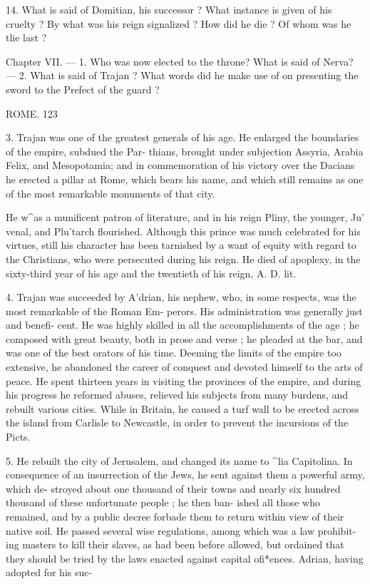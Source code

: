 \documentclass[openany,a4paper]{memoir}
\begin{document}
14. What is said of Domitian, his successor ? What instance is given 
of his cruelty ? By what was his reign signalized ? How did he die ? 
Of whom was he tlie last ? 

Chapter VII. — 1. Who was now elected to the throne? What is 
said of Nerva? — 2. What is said of Trajan ? What words did he make 
use of on presenting the sword to the Prefect of the guard ? 



ROME. 123 

3. Trajan was one of the greatest generals of his age. He 
enlarged the boundaries of the empire, subdued the Par- 
thians, brought under subjection Assyria, Arabia Felix, and 
Mesopotamia; and in commemoration of his victory over 
the Dacians he erected a pillar at Rome, which bears his 
name, and which still remains as one of the most remarkable 
monuments of that city. 

He w^as a munificent patron of literature, and in his 
reign Pliny, the younger, Ju' venal, and Plu'tarch flourished. 
Although this prince was much celebrated for his virtues, 
still his character has been tarnished by a want of equity 
with regard to the Christians, who were persecuted during 
his reign. He died of apoplexy, in the sixty-third year of 
his age and the twentieth of his reign, A. D. lit. 

4. Trajan was succeeded by A'drian, his nephew, who, in 
some respects, was the most remarkable of the Roman Em- 
perors. His administration was generally just and benefi- 
cent. He was highly skilled in all the accomplishments of 
the age ; he composed with great beauty, both in prose and 
verse ; he pleaded at the bar, and was one of the best orators 
of his time. Deeming the limits of the empire too extensive, 
he abandoned the career of conquest and devoted himself to 
the arts of peace. He spent thirteen years in visiting the 
provinces of the empire, and during his progress he reformed 
abuses, relieved his subjects from many burdens, and rebuilt 
various cities. While in Britain, he caused a turf wall to be 
erected across the island from Carlisle to Newcastle, in order 
to prevent the incursions of the Picts. 

5. He rebuilt the city of Jerusalem, and changed its name 
to ^lia Capitolina. In consequence of an insurrection of 
the Jews, he sent against them a powerful army, which de- 
stroyed about one thousand of their towns and nearly six 
hundred thousand of these unfortunate people ; he then ban- 
ished all those who remained, and by a public decree forbade 
them to return within view of their native soil. He passed 
several wise regulations, among which was a law prohibit- 
ing masters to kill their slaves, as had been before allowed, 
but ordained that they should be tried by the laws enacted 
against capital ofi*ences. Adrian, having adopted for his suc- 
\end{document}
